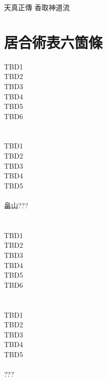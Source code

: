 \documentclass[dvipdfmx, a4paper, 12pt]{utarticle}
\begin{document}
\begin{CJK*}{UTF8}{min}
\CJKtilde
\begin{landscape}

\newpage
\pagestyle{empty}
天真正傳
香取神道流
\section{居合術表六箇條}
\noindent TBD1\\
TBD2\\
TBD3\\
TBD4\\
TBD5\\
TBD6\\
\section{}
\noindent TBD1\\
TBD2\\
TBD3\\
TBD4\\
TBD5\\
\\
畠山???

\setcounter{section}{0}
\newpage
\pagestyle{empty}
\section{}
\noindent TBD1\\
TBD2\\
TBD3\\
TBD4\\
TBD5\\
TBD6\\
\section{}
\noindent TBD1\\
TBD2\\
TBD3\\
TBD4\\
TBD5\\
\\
???


\end{landscape}
\end{CJK*}
\end{document}
